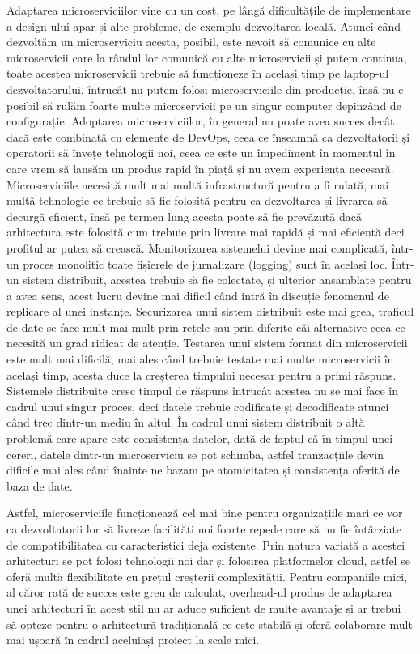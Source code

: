 Adaptarea microserviciilor vine cu un cost, pe lângă dificultățile de implementare a design-ului apar
și alte probleme, de exemplu dezvoltarea locală. Atunci când dezvoltăm un microserviciu acesta, posibil,
este nevoit să comunice cu alte microservicii care la rândul lor comunică cu alte microservicii și putem continua,
toate acestea microservicii trebuie să funcționeze în același timp pe laptop-ul dezvoltatorului,
întrucât nu putem folosi microserviciile din producție, însă nu e posibil să rulăm foarte multe
microservicii pe un singur computer depinzând de configurație. Adoptarea microserviciilor,
în general nu poate avea succes decât dacă este combinată cu elemente de DevOps, ceea ce înseamnă
ca dezvoltatorii și operatorii să învețe tehnologii noi, ceea ce este un împediment în momentul
în care vrem să lansăm un produs rapid în piață și nu avem experiența necesară. Microserviciile necesită
mult mai multă infrastructură pentru a fi rulată, mai multă tehnologie ce trebuie să fie folosită
pentru ca dezvoltarea și livrarea să decurgă eficient, însă pe termen lung acesta poate să
fie prevăzută dacă arhitectura este folosită cum trebuie prin livrare mai rapidă și mai eficientă
deci profitul ar putea să crească. Monitorizarea sistemelui devine mai complicată, într-un proces monolitic
toate fișierele de jurnalizare (logging) sunt în același loc. Într-un sistem distribuit, acestea 
trebuie să fie colectate, și ulterior ansamblate pentru a avea sens, acest lucru devine mai dificil când
intră în discuție fenomenul de replicare al unei instanțe. Securizarea unui sistem distribuit este
mai grea, traficul de date se face mult mai mult prin rețele sau prin diferite căi alternative ceea 
ce necesită un grad ridicat de atenție. Testarea unui sistem format din microservicii este mult mai
dificilă, mai ales când trebuie testate mai multe microservicii în același timp, acesta duce la creșterea
timpului necesar pentru a primi răspuns. Sistemele distribuite cresc timpul de răspuns întrucât acestea nu
se mai face în cadrul unui singur proces, deci datele trebuie codificate și decodificate atunci când trec
dintr-un mediu în altul. În cadrul unui sistem distribuit o altă problemă care apare este consistența 
datelor, dată de faptul că în timpul unei cereri, datele dintr-un microserviciu se pot schimba, astfel
tranzacțiile devin dificile mai ales când înainte ne bazam pe atomicitatea și consistența oferită de 
baza de date.

Astfel, microserviciile funcționează cel mai bine pentru organizațiile mari ce vor ca dezvoltatorii
lor să livreze facilități noi foarte repede care să nu fie întârziate de compatibilitatea cu 
caracteristici deja existente. Prin natura variată a acestei arhitecturi se pot folosi tehnologii noi
dar și folosirea platformelor cloud, astfel se oferă multă flexibilitate cu prețul creșterii 
complexității. Pentru companiile mici, al căror rată de succes este greu de calculat, overhead-ul 
produs de adaptarea unei arhitecturi în acest stil nu ar aduce suficient de multe avantaje și ar
trebui să opteze pentru o arhitectură tradițională ce este stabilă și oferă colaborare mult mai ușoară
în cadrul aceluiași proiect la scale mici. 
